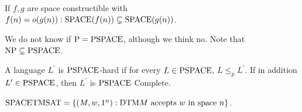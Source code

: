 \begin{note}
  If $f, g$ are space constructible with
  $f(n) = o(g(n)): \mathrm{SPACE}(f(n)) \subsetneq \mathrm{SPACE}(g(n))$.
\end{note}

\begin{note}
  We do not know if $\mathrm{P} = \mathrm{PSPACE}$, although we think no.
  Note that $\mathrm{NP} \subseteq \mathrm{PSPACE}$.
\end{note}

\begin{note}
  A language $L^\prime$ is $\mathrm{PSPACE}$-hard if for every $L \in \mathrm{PSPACE}$,
  $L \leq_p L^\prime$.
  If in addition $L^\prime \in \mathrm{PSPACE}$, then $L^\prime$ is
  $\mathrm{PSPACE}$ Complete.
\end{note}

\begin{note}[$\SPACE \TMSAT$]
  $\mathrm{SPACE} \mathrm{TMSAT} = \left\{ (M, w, 1^n) :
    \text{$\mathrm{DTM} M$ accepts $w$ in space $n$} \right\}$.
\end{note}
